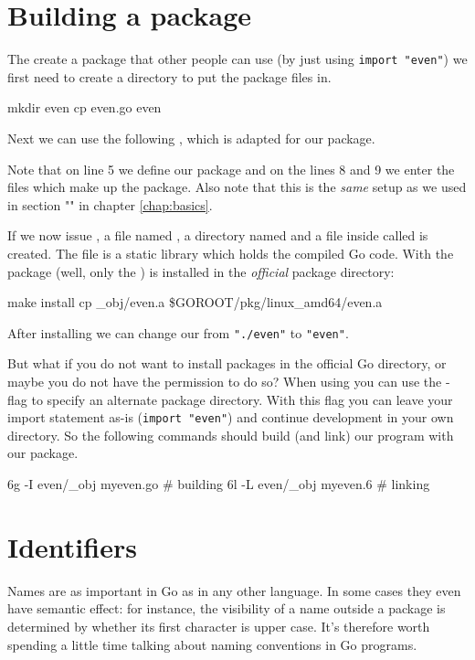 \section{Building a package}
\label{sec:building a package}
The create a package that other people can use (by just using
\lstinline{import "even"}) we first need to create a directory
to put the package files in. 
\begin{display}
\pr mkdir even
\pr cp even.go even
\end{display}
\noindent{}Next we 
can use the following 
, which 
is adapted for our  package.

Note that on line 5 we define our  package and on the
lines 8 and 9 we enter the files which make up the package.
Also note that this is the \emph{same}  setup as we used
in section "" in chapter
\ref{chap:basics}.

If we now issue , a file named , a directory
named  and a file inside  called  
is created. The file  is a static library which holds
the compiled Go code.
With  the package (well, only the ) is installed in the \emph{official}
package directory:
\begin{display}
\pr make install
cp \_obj/even.a \$GOROOT/pkg/linux\_amd64/even.a
\end{display}
\noindent{}After installing we can change our  from
\lstinline{"./even"} to \lstinline{"even"}.

But what if you do not want to install packages in the official Go
directory, or maybe you do not have the permission to do so? When using
 you can use the -flag to specify an alternate
package directory. With this flag you can leave your import statement
as-is (\lstinline{import "even"}) and continue development in your
own directory. So the following commands should build (and link) our
 program with our package.
\begin{display}
\pr 6g -I even/\_obj myeven.go	# building
\pr 6l -L even/\_obj myeven.6	# linking
\end{display}

\section{Identifiers}
Names are as important in Go as in any other language. In some cases
they even have semantic effect: for instance, the visibility of a name
outside a package is determined by whether its first character is upper
case. It's therefore worth spending a little time talking about naming
conventions in Go programs.


